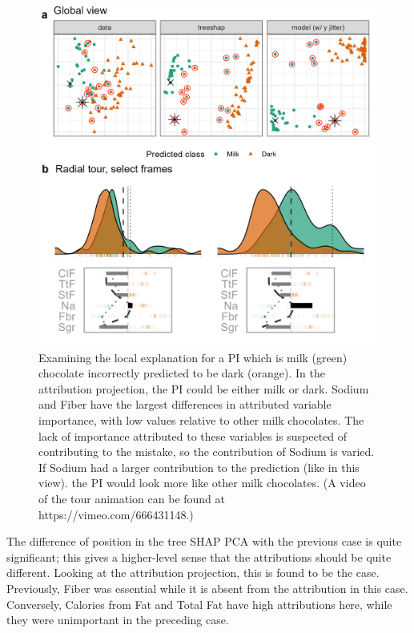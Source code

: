 \documentclass[
]{jss}
\begin{document}
\begin{CodeChunk}
\begin{figure}

{\centering \includegraphics[width=1\linewidth]{./figures/case_chocolates_inverse} 

}

\caption[Examining the local explanation for a PI which is milk (green) chocolate incorrectly predicted to be dark (orange)]{Examining the local explanation for a PI which is milk (green) chocolate incorrectly predicted to be dark (orange). In the attribution projection, the PI could be either milk or dark. Sodium and Fiber have the largest differences in attributed variable importance, with low values relative to other milk chocolates. The lack of importance attributed to these variables is suspected of contributing to the mistake, so the contribution of Sodium is varied. If Sodium had a larger contribution to the prediction (like in this view). the PI would look more like other milk chocolates. (A video of the tour animation can be found at https://vimeo.com/666431148.)}\label{fig:casechocolatesinverse}
\end{figure}
\end{CodeChunk}

The difference of position in the tree SHAP PCA with the previous case
is quite significant; this gives a higher-level sense that the
attributions should be quite different. Looking at the attribution
projection, this is found to be the case. Previously, Fiber was
essential while it is absent from the attribution in this case.
Conversely, Calories from Fat and Total Fat have high attributions here,
while they were unimportant in the preceding case.
\end{document}
